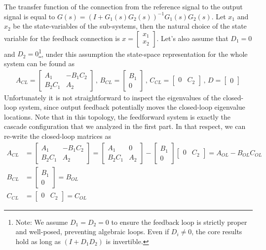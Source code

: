 \documentclass[twoside]{article}
\begin{document}
The transfer function of the connection from the reference signal to the output signal is equal to 
$G(s) = \left( I + G_1(s) G_2(s) \right)^{-1} G_1(s) G_2(s)$. Let $x_1$ and $x_2$
be the state-variables of the sub-systems, then the natural choice of the state variable for the feedback connection is 
$x = \begin{bmatrix} x_1 \\ x_2 \end{bmatrix}$. Let's also assume that $D_1 = 0$ and $D_2 = 0$\footnote{Note: We assume $D_1=D_2=0$ to ensure the feedback loop is strictly proper and well-posed, preventing algebraic loops. Even if $D_i \neq 0$, the core results hold as long as $(I + D_1 D_2)$ is invertible.}, under this assumption the state-space representation for the whole system can be found as
%
\begin{align*}
A_{CL} = \left[ \begin{array}{c|c} A_1 & -B_1 C_2 \\ \hline B_2 C_1  & A_2 \end{array} \right]
\, , \, B_{CL} = \left[ \begin{array}{c} B_1 \\ \hline 0  \end{array} \right]
\, , \, C_{CL} = \left[ \begin{array}{c|c} 0 & C_2  \end{array} \right]
\, , \, D = \left[ \begin{array}{c} 0 \end{array} \right]
\end{align*}
%
Unfortunately it is not straightforward to inspect the eigenvalues of the closed-loop system, since
output feedback potentially moves the closed-loop eigenvalue locations. Note that in this topology, 
the feedforward system is exactly the cascade configuration that we analyzed in the first part. In that respect, we
can re-write the closed-loop matrices as
\begin{align*}
A_{CL} &= \left[ \begin{array}{c|c} A_1 & -B_1 C_2 \\ \hline B_2 C_1  & A_2 \end{array} \right]
= \left[ \begin{array}{c|c} A_1 & 0 \\ \hline B_2 C_1  & A_2 \end{array} \right] - \left[ \begin{array}{c} B_1 \\ \hline 0  \end{array} \right] \left[ \begin{array}{c|c} 0 & C_2  \end{array} \right] = A_{OL} - B_{OL} C_{OL}
\\ 
B_{CL} &= \left[ \begin{array}{c} B_1 \\ \hline 0  \end{array} \right] = B_{OL}
\\
C_{CL} &= \left[ \begin{array}{c|c} 0 & C_2  \end{array} \right] = C_{OL}
\end{align*}
\end{document}
